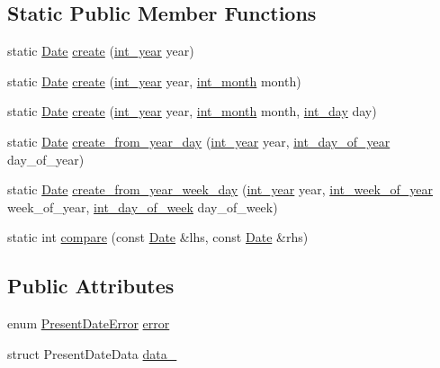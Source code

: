 \subsection*{\-Static \-Public \-Member \-Functions}
\begin{DoxyCompactItemize}
\item 
static \hyperlink{structDate}{\-Date} \hyperlink{structDate_af6a6aa2e75464311dc7eee91e25aee47}{create} (\hyperlink{types_8h_a7ff53e164374f5b24e06f3c04362e61d}{int\-\_\-year} year)
\item 
static \hyperlink{structDate}{\-Date} \hyperlink{structDate_a0b1280e69ec6310ec8cdfb730e8dd7f6}{create} (\hyperlink{types_8h_a7ff53e164374f5b24e06f3c04362e61d}{int\-\_\-year} year, \hyperlink{types_8h_a6e77e4e37237551e3c2f808f02764cec}{int\-\_\-month} month)
\item 
static \hyperlink{structDate}{\-Date} \hyperlink{structDate_ae0bcc2332237bf0f5b57ed646a00e6ac}{create} (\hyperlink{types_8h_a7ff53e164374f5b24e06f3c04362e61d}{int\-\_\-year} year, \hyperlink{types_8h_a6e77e4e37237551e3c2f808f02764cec}{int\-\_\-month} month, \hyperlink{types_8h_a2ee09cac57b5b71a2cf76051e877f320}{int\-\_\-day} day)
\item 
static \hyperlink{structDate}{\-Date} \hyperlink{structDate_afed458a3a1ff055cebdbd153bb00d5a4}{create\-\_\-from\-\_\-year\-\_\-day} (\hyperlink{types_8h_a7ff53e164374f5b24e06f3c04362e61d}{int\-\_\-year} year, \hyperlink{types_8h_ae73cc4736210d3120e1073d94bbac092}{int\-\_\-day\-\_\-of\-\_\-year} day\-\_\-of\-\_\-year)
\item 
static \hyperlink{structDate}{\-Date} \hyperlink{structDate_a282993d00829e727eac88615cb2f1146}{create\-\_\-from\-\_\-year\-\_\-week\-\_\-day} (\hyperlink{types_8h_a7ff53e164374f5b24e06f3c04362e61d}{int\-\_\-year} year, \hyperlink{types_8h_af13e483c5f00ae8ea8ada4c7f5fad337}{int\-\_\-week\-\_\-of\-\_\-year} week\-\_\-of\-\_\-year, \hyperlink{types_8h_a78b244794c680f1753a6d92eed77aeda}{int\-\_\-day\-\_\-of\-\_\-week} day\-\_\-of\-\_\-week)
\item 
static int \hyperlink{structDate_afc234509ba1c8b1717e52181e7ad256d}{compare} (const \hyperlink{structDate}{\-Date} \&lhs, const \hyperlink{structDate}{\-Date} \&rhs)
\end{DoxyCompactItemize}
\subsection*{\-Public \-Attributes}
\begin{DoxyCompactItemize}
\item 
enum \hyperlink{date_8h_a42798e6b91456e88f492437d3e826c0b}{\-Present\-Date\-Error} \hyperlink{structDate_adb2a42cb857f6462788b856b2f60cfb2}{error}
\item 
struct \-Present\-Date\-Data \hyperlink{structDate_a15a7ce699435bf3c9c60bfff5e1806de}{data\-\_\-}
\end{DoxyCompactItemize}
